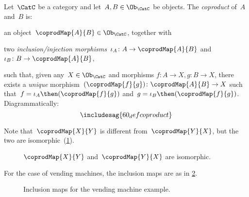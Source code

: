 \begin{ctdefinition}[Coproduct]
\label{def:catcoproduct}
Let~$\CatC$ be a category and let~$A, B \in \Ob_{\CatC}$ be objects. The \emph{coproduct} of~$A$ and~$B$ is:
\begin{compactenum}
\item an object~$\coprodMap{A}{B} \in \Ob_{\CatC}$, together with
\item two \emph{inclusion/injection morphisms}~$\iota_A \colon A \to \coprodMap{A}{B} $ and~$\iota_B \colon B \to \coprodMap{A}{B}$,
\end{compactenum}
such that, given any~$X \in \Ob_{\CatC}$ and morphisms $f\colon  A \to X, g \colon B \to X$, there exists a \emph{unique} morphism~$(\coprodMap{f}{g}) \colon \coprodMap{A}{B} \to X$ such that~$f = \iota_A\then (\coprodMap{f}{g})$ and~$g = \iota_B \then (\coprodMap{f}{g})$. Diagrammatically:
\begin{equation}
\includesag{60_defcoproduct}
\end{equation}
\end{ctdefinition} 

Note that~$\coprodMap{X}{Y}$ is different from~$\coprodMap{Y}{X}$, but the two are isomorphic~(\cref{fig:e16}).

\begin{figure}[h!]
    \centering
    \caption{$\coprodMap{X}{Y}$ and~$\coprodMap{Y}{X}$ are isomorphic. \label{fig:e16}}
\end{figure}
For the case of vending machines, the inclusion maps are as in \cref{fig:inclusionvending}.

\begin{figure}[h!]
    \centering
    \caption{Inclusion maps for the vending machine example. \label{fig:inclusionvending}}
\end{figure}

